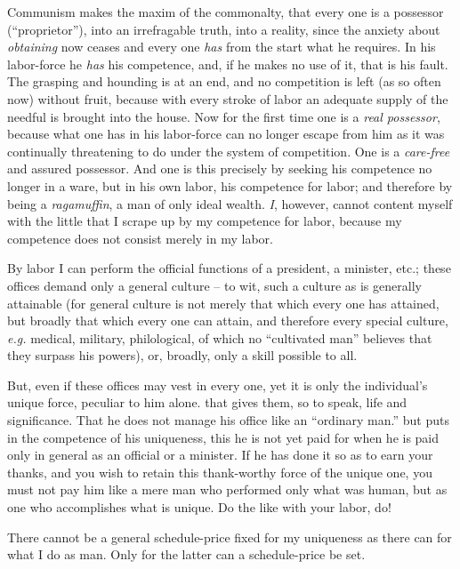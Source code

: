 \documentclass[12pt,a4paper]{book}
\begin{document}
Communism makes the maxim of the commonalty, that every one is a possessor 
(``proprietor''), into an irrefragable truth, into a reality, since the 
anxiety about \textit{obtaining} now ceases and every one \textit{has} from 
the start what he requires. In his labor-force he \textit{has} his competence, 
and, if he makes no use of it, that is his fault. The grasping and hounding is 
at an end, and no competition is left (as so often now) without fruit, because 
with every stroke of labor an adequate supply of the needful is brought into 
the house. Now for the first time one is a \textit{real possessor}, because 
what one has in his labor-force can no longer escape from him as it was 
continually threatening to do under the system of competition. One is a 
\textit{care-free} and assured possessor. And one is this precisely by seeking 
his competence no longer in a ware, but in his own labor, his competence for 
labor; and therefore by being a \textit{ragamuffin}, a man of only ideal 
wealth. \textit{I}, however, cannot content myself with the little that I 
scrape up by my competence for labor, because my competence does not consist 
merely in my labor.

By labor I can perform the official functions of a president, a minister, 
etc.; these offices demand only a general culture -- to wit, such a culture as 
is generally attainable (for general culture is not merely that which every 
one has attained, but broadly that which every one can attain, and therefore 
every special culture, \textit{e.g.} medical, military, philological, of 
which no ``cultivated man'' believes that they surpass his powers), or, 
broadly, only a skill possible to all.

But, even if these offices may vest in every one, yet it is only the 
individual's unique force, peculiar to him alone. that gives them, so to 
speak, life and significance. That he does not manage his office like an 
``ordinary man.'' but puts in the competence of his uniqueness, this he is 
not yet paid for when he is paid only in general as an official or a minister. 
If he has done it so as to earn your thanks, and you wish to retain this 
thank-worthy force of the unique one, you must not pay him like a mere man who 
performed only what was human, but as one who accomplishes what is unique. Do 
the like with your labor, do!

There cannot be a general schedule-price fixed for my uniqueness as there can 
for what I do as man. Only for the latter can a schedule-price be set.
\end{document}
